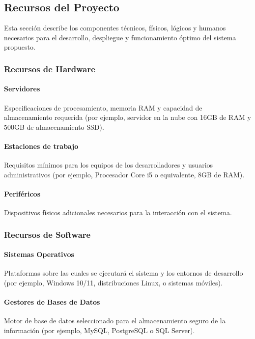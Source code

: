 \subsection{Recursos del Proyecto}

Esta sección describe los componentes técnicos, físicos, lógicos y humanos necesarios para el desarrollo, despliegue y funcionamiento óptimo del sistema propuesto.

\subsubsection{Recursos de Hardware}

\paragraph{Servidores} Especificaciones de procesamiento, memoria RAM y capacidad de almacenamiento requerida (por ejemplo, servidor en la nube con 16GB de RAM y 500GB de almacenamiento SSD).

\paragraph{Estaciones de trabajo} Requisitos mínimos para los equipos de los desarrolladores y usuarios administrativos (por ejemplo, Procesador Core i5 o equivalente, 8GB de RAM).

\paragraph{Periféricos} Dispositivos físicos adicionales necesarios para la interacción con el sistema.

\subsubsection{Recursos de Software}

\paragraph{Sistemas Operativos} Plataformas sobre las cuales se ejecutará el sistema y los entornos de desarrollo (por ejemplo, Windows 10/11, distribuciones Linux, o sistemas móviles).

\paragraph{Gestores de Bases de Datos} Motor de base de datos seleccionado para el almacenamiento seguro de la información (por ejemplo, MySQL, PostgreSQL o SQL Server).

